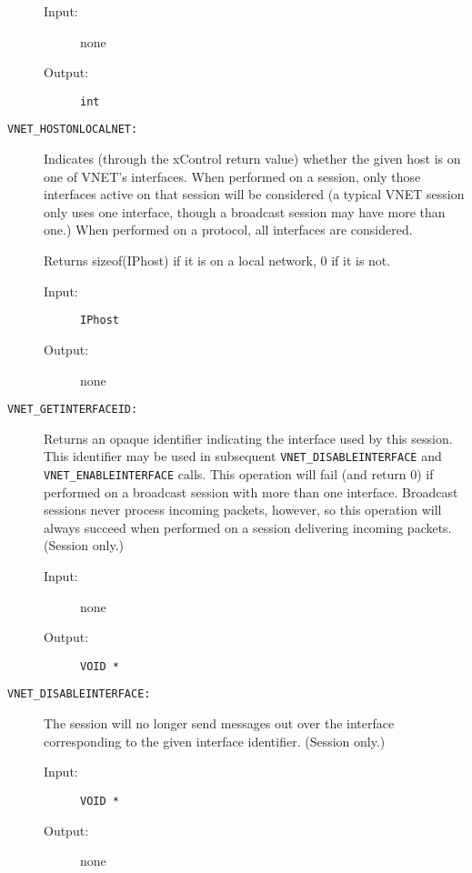 \begin{description}
\begin{description}
\item[{\rm Input:}] none
\item[{\rm Output:}] {\tt int}
\end{description}



\item[{\tt VNET\_HOSTONLOCALNET:}]
{

Indicates (through the xControl return value) whether the given host
is on one of VNET's interfaces.  When performed on a session, only
those interfaces active on that session will be considered (a typical
VNET session only uses one interface, though a broadcast session may
have more than one.)  When performed on a protocol, all interfaces are
considered. 

Returns sizeof(IPhost) if it is
on a local network, 0 if it is not.
}

\begin{description}
\item[{\rm Input:}] {\tt IPhost}
\item[{\rm Output:}] none
\end{description}


\item[{\tt VNET\_GETINTERFACEID:}]
Returns an opaque identifier indicating the interface used by this
session.  This identifier may be used in subsequent
{\tt VNET\_DISABLEINTERFACE} and {\tt VNET\_ENABLEINTERFACE} calls.
This operation will fail (and return 0) if performed on a broadcast session
with more than one interface.  Broadcast sessions never process
incoming packets, however, so this operation will always succeed when
performed on a session delivering incoming packets.  (Session only.)

\begin{description}
\item[{\rm Input:}] none
\item[{\rm Output:}] { \tt VOID * }
\end{description}


\item[{\tt VNET\_DISABLEINTERFACE:}]
The session will no longer send messages out over the interface
corresponding to the given interface identifier.  (Session only.)

\begin{description}
\item[{\rm Input:}] { \tt VOID * }
\item[{\rm Output:}] none
\end{description}



\end{description}

